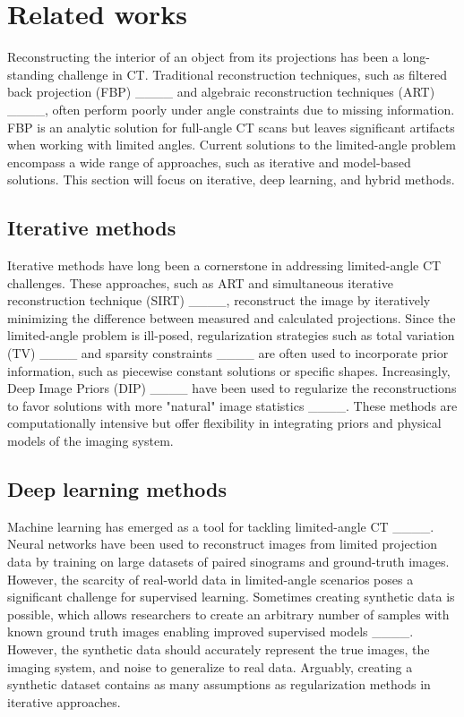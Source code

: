 \section{Related works}
Reconstructing the interior of an object from its projections has been a long-standing challenge in CT. Traditional reconstruction
techniques, such as filtered back projection (FBP) ____ and algebraic
reconstruction techniques (ART) ____, often perform poorly under angle constraints due to missing information. FBP is an analytic solution for full-angle CT scans but leaves significant artifacts when working with limited angles. Current solutions to the limited-angle problem encompass a wide range of approaches, such as iterative and model-based solutions. This section will focus on iterative, deep learning, and hybrid methods.

\subsection{Iterative methods}
Iterative methods have long been a cornerstone in addressing limited-angle CT challenges. These approaches, such as ART and simultaneous iterative reconstruction technique (SIRT) ____, reconstruct the image by iteratively minimizing the difference between measured and calculated projections. Since the limited-angle problem is ill-posed, regularization strategies such as total variation (TV) ____ and sparsity constraints ____ are often used to incorporate prior information, such as piecewise constant solutions or specific shapes. Increasingly, Deep Image Priors (DIP) ____ have been used to regularize the reconstructions to favor solutions with more "natural" image statistics ____.
These methods are computationally intensive but offer flexibility in integrating priors and physical models of the imaging system.

\subsection{Deep learning methods}
Machine learning has emerged as a tool for tackling limited-angle CT ____.
Neural networks have been used to reconstruct images from limited projection data by training on large datasets of paired sinograms and ground-truth images. However, the scarcity of real-world data in limited-angle scenarios poses a significant challenge for supervised learning.
Sometimes creating synthetic data is possible, which allows researchers to create an arbitrary number of samples with known ground truth images enabling improved supervised models ____.
However, the synthetic data should accurately represent the true images, the imaging system, and noise to generalize to real data. Arguably, creating a synthetic dataset contains as many assumptions as regularization methods in iterative approaches.



